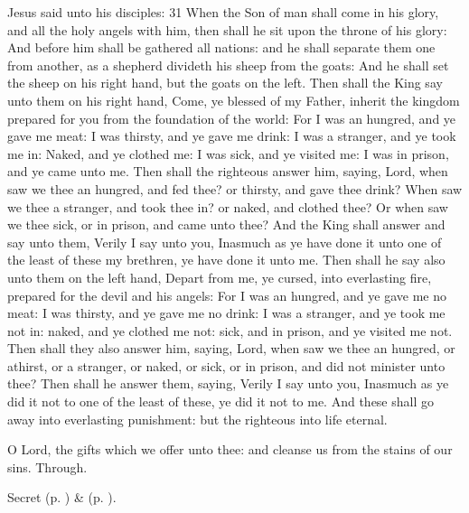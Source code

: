  Jesus said unto his disciples: 31 When the Son of man shall come in his glory, and all the holy angels with him, then shall he sit upon the throne of his glory: And before him shall be gathered all nations: and he shall separate them one from another, as a shepherd divideth his sheep from the goats: And he shall set the sheep on his right hand, but the goats on the left. Then shall the King say unto them on his right hand, Come, ye blessed of my Father, inherit the kingdom prepared for you from the foundation of the world: For I was an hungred, and ye gave me meat: I was thirsty, and ye gave me drink: I was a stranger, and ye took me in: Naked, and ye clothed me: I was sick, and ye visited me: I was in prison, and ye came unto me. Then shall the righteous answer him, saying, Lord, when saw we thee an hungred, and fed thee? or thirsty, and gave thee drink? When saw we thee a stranger, and took thee in? or naked, and clothed thee? Or when saw we thee sick, or in prison, and came unto thee? And the King shall answer and say unto them, Verily I say unto you, Inasmuch as ye have done it unto one of the least of these my brethren, ye have done it unto me. Then shall he say also unto them on the left hand, Depart from me, ye cursed, into everlasting fire, prepared for the devil and his angels: For I was an hungred, and ye gave me no meat: I was thirsty, and ye gave me no drink: I was a stranger, and ye took me not in: naked, and ye clothed me not: sick, and in prison, and ye visited me not. Then shall they also answer him, saying, Lord, when saw we thee an hungred, or athirst, or a stranger, or naked, or sick, or in prison, and did not minister unto thee? Then shall he answer them, saying, Verily I say unto you, Inasmuch as ye did it not to one of the least of these, ye did it not to me. And these shall go away into everlasting punishment: but the righteous into life eternal.


\secret
{} O Lord, the gifts which we offer unto thee: and cleanse us from the stains of our sins. Through.


\begin{rubric}
     Secret  (p. \pageref{AshWednesdayMassSecret}) \&   (p. \pageref{SPLivingDeparted}).
\end{rubric}

